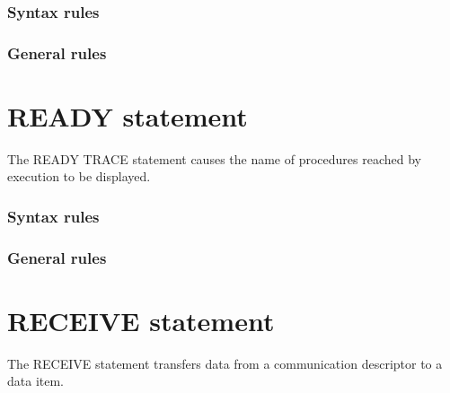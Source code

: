 \subsubsection{Syntax rules}

\subsubsection{General rules}

\section{READY statement}

The READY TRACE statement causes the name of procedures reached by execution to be displayed.

\begin{syntax}[\miscextcolour]
   
\end{syntax}

\subsubsection{Syntax rules}

\subsubsection{General rules}

\section{RECEIVE statement}

The RECEIVE statement transfers data from a communication descriptor to a data item.

\begin{syntax}[\deletedcolour]


\end{syntax}

